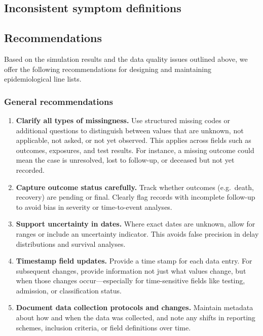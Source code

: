 \documentclass[11pt,a4paper]{article}
\begin{document}

\subsection{Inconsistent symptom definitions}


\subsection{Recommendations}

Based on the simulation results and the data quality issues outlined above, we offer the following recommendations for designing and maintaining epidemiological line lists.

\subsubsection{General recommendations}

\begin{enumerate}
  \item \textbf{Clarify all types of missingness.}
    Use structured missing codes or additional questions to distinguish between values that are unknown, not applicable, not asked, or not yet observed.
    This applies across fields such as outcomes, exposures, and test results.
    For instance, a missing outcome could mean the case is unresolved, lost to follow-up, or deceased but not yet recorded.

  \item \textbf{Capture outcome status carefully.}
    Track whether outcomes (e.g.\ death, recovery) are pending or final.
    Clearly flag records with incomplete follow-up to avoid bias in severity or time-to-event analyses.

  \item \textbf{Support uncertainty in dates.}
    Where exact dates are unknown, allow for ranges or include an uncertainty indicator.
    This avoids false precision in delay distributions and survival analyses.

  \item \textbf{Timestamp field updates.}
    Provide a time stamp for each data entry.
    For subsequent changes, provide information not just what values change, but when those changes occur---especially for time-sensitive fields like testing, admission, or classification status.

  \item \textbf{Document data collection protocols and changes.}
    Maintain metadata about how and when the data was collected, and note any shifts in reporting schemes, inclusion criteria, or field definitions over time.
\end{enumerate}
\end{document}
